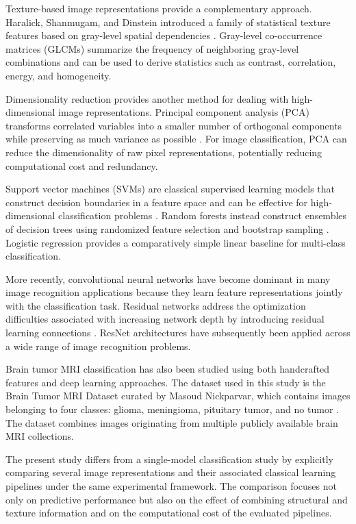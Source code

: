\documentclass[11pt,a4paper]{article}
\begin{document}
Texture-based image representations provide a complementary approach. Haralick, Shanmugam, and Dinstein introduced a family of statistical texture features based on gray-level spatial dependencies \cite{haralick1973textural}. Gray-level co-occurrence matrices (GLCMs) summarize the frequency of neighboring gray-level combinations and can be used to derive statistics such as contrast, correlation, energy, and homogeneity.

Dimensionality reduction provides another method for dealing with high-dimensional image representations. Principal component analysis (PCA) transforms correlated variables into a smaller number of orthogonal components while preserving as much variance as possible \cite{jolliffe2002principal}. For image classification, PCA can reduce the dimensionality of raw pixel representations, potentially reducing computational cost and redundancy.

Support vector machines (SVMs) are classical supervised learning models that construct decision boundaries in a feature space and can be effective for high-dimensional classification problems \cite{cortes1995support}. Random forests instead construct ensembles of decision trees using randomized feature selection and bootstrap sampling \cite{breiman2001random}. Logistic regression provides a comparatively simple linear baseline for multi-class classification.

More recently, convolutional neural networks have become dominant in many image recognition applications because they learn feature representations jointly with the classification task. Residual networks address the optimization difficulties associated with increasing network depth by introducing residual learning connections \cite{he2016deep}. ResNet architectures have subsequently been applied across a wide range of image recognition problems.

Brain tumor MRI classification has also been studied using both handcrafted features and deep learning approaches. The dataset used in this study is the Brain Tumor MRI Dataset curated by Masoud Nickparvar, which contains images belonging to four classes: glioma, meningioma, pituitary tumor, and no tumor \cite{nickparvar_dataset}. The dataset combines images originating from multiple publicly available brain MRI collections.

The present study differs from a single-model classification study by explicitly comparing several image representations and their associated classical learning pipelines under the same experimental framework. The comparison focuses not only on predictive performance but also on the effect of combining structural and texture information and on the computational cost of the evaluated pipelines.
\end{document}
